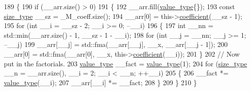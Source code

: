 \begin{DoxyCode}
189       \{
190         \textcolor{keywordflow}{if} (\_\_arr.size() > 0)
191           \{
192             \_\_arr.fill(\hyperlink{class____gnu__cxx_1_1__Polynomial_a725563351f50e76084a7a016c06f8a53}{value\_type}\{\});
193             \textcolor{keyword}{const} \hyperlink{class____gnu__cxx_1_1__Polynomial_a8b25fcfd4acaad0c5c08b649c22da28a}{size\_type} \_\_sz = \_M\_coeff.size();
194             \_\_arr[0] = this->\hyperlink{class____gnu__cxx_1_1__Polynomial_a7cee31b3acbe8c024af6d696bc610f49}{coefficient}(\_\_sz - 1);
195             \textcolor{keywordflow}{for} (\textcolor{keywordtype}{int} \_\_i = \_\_sz - 2; \_\_i >= 0; --\_\_i)
196               \{
197                 \textcolor{keywordtype}{int} \_\_nn = std::min(\_\_arr.size() - 1, \_\_sz - 1 - \_\_i);
198                 \textcolor{keywordflow}{for} (\textcolor{keywordtype}{int} \_\_j = \_\_nn; \_\_j >= 1; --\_\_j)
199                   \_\_arr[\_\_j] = std::fma(\_\_arr[\_\_j], \_\_x, \_\_arr[\_\_j - 1]);
200                 \_\_arr[0] = std::fma(\_\_arr[0], \_\_x, this->\hyperlink{class____gnu__cxx_1_1__Polynomial_a7cee31b3acbe8c024af6d696bc610f49}{coefficient}(\_\_i));
201               \}
202             \textcolor{comment}{//  Now put in the factorials.}
203             \hyperlink{class____gnu__cxx_1_1__Polynomial_a725563351f50e76084a7a016c06f8a53}{value\_type} \_\_fact = \hyperlink{class____gnu__cxx_1_1__Polynomial_a725563351f50e76084a7a016c06f8a53}{value\_type}(1);
204             \textcolor{keywordflow}{for} (\hyperlink{class____gnu__cxx_1_1__Polynomial_a8b25fcfd4acaad0c5c08b649c22da28a}{size\_type} \_\_n = \_\_arr.size(), \_\_i = 2; \_\_i < \_\_n; ++\_\_i)
205               \{
206                 \_\_fact *= \hyperlink{class____gnu__cxx_1_1__Polynomial_a725563351f50e76084a7a016c06f8a53}{value\_type}(\_\_i);
207                 \_\_arr[\_\_i] *= \_\_fact;
208               \}
209           \}
210       \}
\end{DoxyCode}
\mbox{\label{class____gnu__cxx_1_1__Polynomial_a2251cb8f6518118c78494f4eb015ed8f}} 
